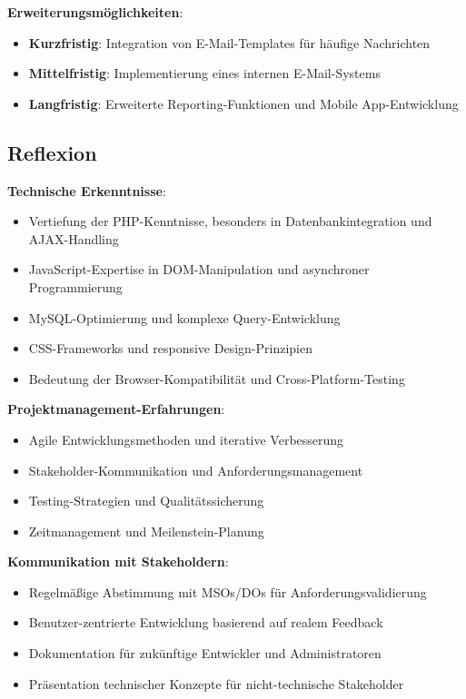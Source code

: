 \documentclass[11pt,a4paper]{article}
\begin{document}
\textbf{Erweiterungsmöglichkeiten}:
\begin{itemize}
    \item \textbf{Kurzfristig}: Integration von E-Mail-Templates für häufige Nachrichten
    \item \textbf{Mittelfristig}: Implementierung eines internen E-Mail-Systems
    \item \textbf{Langfristig}: Erweiterte Reporting-Funktionen und Mobile App-Entwicklung
\end{itemize}

\subsection{Reflexion}
\textbf{Technische Erkenntnisse}:
\begin{itemize}
    \item Vertiefung der PHP-Kenntnisse, besonders in Datenbankintegration und AJAX-Handling
    \item JavaScript-Expertise in DOM-Manipulation und asynchroner Programmierung
    \item MySQL-Optimierung und komplexe Query-Entwicklung
    \item CSS-Frameworks und responsive Design-Prinzipien
    \item Bedeutung der Browser-Kompatibilität und Cross-Platform-Testing
\end{itemize}

\textbf{Projektmanagement-Erfahrungen}:
\begin{itemize}
    \item Agile Entwicklungsmethoden und iterative Verbesserung
    \item Stakeholder-Kommunikation und Anforderungsmanagement
    \item Testing-Strategien und Qualitätssicherung
    \item Zeitmanagement und Meilenstein-Planung
\end{itemize}

\textbf{Kommunikation mit Stakeholdern}:
\begin{itemize}
    \item Regelmäßige Abstimmung mit MSOs/DOs für Anforderungsvalidierung
    \item Benutzer-zentrierte Entwicklung basierend auf realem Feedback
    \item Dokumentation für zukünftige Entwickler und Administratoren
    \item Präsentation technischer Konzepte für nicht-technische Stakeholder
\end{itemize}
\end{document}
